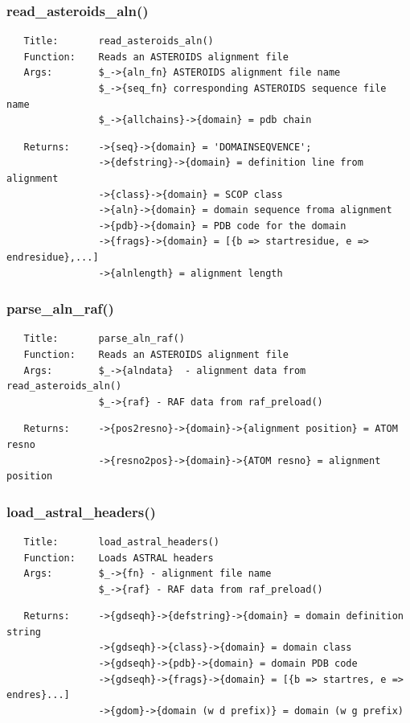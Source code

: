 \documentclass{article}
\begin{document}
\subsubsection*{read\_asteroids\_aln()\label{pibase::ASTRAL_read_asteroids_aln_}}
\begin{verbatim}
   Title:       read_asteroids_aln()
   Function:    Reads an ASTEROIDS alignment file
   Args:        $_->{aln_fn} ASTEROIDS alignment file name
                $_->{seq_fn} corresponding ASTEROIDS sequence file name
                $_->{allchains}->{domain} = pdb chain
\end{verbatim}
\begin{verbatim}
   Returns:     ->{seq}->{domain} = 'DOMAINSEQVENCE';
                ->{defstring}->{domain} = definition line from alignment
                ->{class}->{domain} = SCOP class
                ->{aln}->{domain} = domain sequence froma alignment
                ->{pdb}->{domain} = PDB code for the domain
                ->{frags}->{domain} = [{b => startresidue, e => endresidue},...]
                ->{alnlength} = alignment length
\end{verbatim}
\subsubsection*{parse\_aln\_raf()\label{pibase::ASTRAL_parse_aln_raf_}}
\begin{verbatim}
   Title:       parse_aln_raf()
   Function:    Reads an ASTEROIDS alignment file
   Args:        $_->{alndata}  - alignment data from read_asteroids_aln()
                $_->{raf} - RAF data from raf_preload()
\end{verbatim}
\begin{verbatim}
   Returns:     ->{pos2resno}->{domain}->{alignment position} = ATOM resno
                ->{resno2pos}->{domain}->{ATOM resno} = alignment position
\end{verbatim}
\subsubsection*{load\_astral\_headers()\label{pibase::ASTRAL_load_astral_headers_}}
\begin{verbatim}
   Title:       load_astral_headers()
   Function:    Loads ASTRAL headers
   Args:        $_->{fn} - alignment file name
                $_->{raf} - RAF data from raf_preload()
\end{verbatim}
\begin{verbatim}
   Returns:     ->{gdseqh}->{defstring}->{domain} = domain definition string
                ->{gdseqh}->{class}->{domain} = domain class
                ->{gdseqh}->{pdb}->{domain} = domain PDB code
                ->{gdseqh}->{frags}->{domain} = [{b => startres, e => endres}...]
                ->{gdom}->{domain (w d prefix)} = domain (w g prefix)
\end{verbatim}
\end{document}
